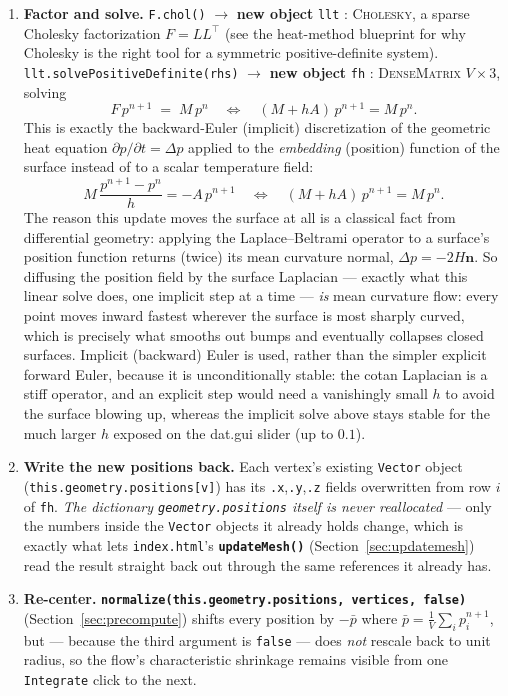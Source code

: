 \documentclass[11pt]{article}
\newcommand{\code}[1]{\texttt{#1}}
\newcommand{\func}[1]{\texttt{\textbf{#1}}}
\newcommand{\type}[1]{\textsc{#1}}
\begin{document}
\begin{enumerate}[leftmargin=1.6em]
\item \textbf{Factor and solve.} \code{F.chol()} $\to$ \textbf{new object} \code{llt} :
  \type{Cholesky}, a sparse Cholesky factorization $F=LL^{\top}$ (see the heat-method
  blueprint for why Cholesky is the right tool for a symmetric positive-definite system).
  \code{llt.solvePositiveDefinite(rhs)} $\to$ \textbf{new object} \code{fh} :
  \type{DenseMatrix} $V\times3$, solving
  \[
    F\,p^{n+1} \;=\; M\,p^{n}
    \quad\Longleftrightarrow\quad
    (M+hA)\,p^{n+1} = M\,p^{n}.
  \]
  This is exactly the backward-Euler (implicit) discretization of the geometric heat
  equation $\partial p/\partial t=\Delta p$ applied to the \emph{embedding} (position)
  function of the surface instead of to a scalar temperature field:
  \[
    M\,\frac{p^{n+1}-p^{n}}{h} = -A\,p^{n+1}
    \quad\Longleftrightarrow\quad
    (M+hA)\,p^{n+1}=M\,p^{n}.
  \]
  The reason this update moves the surface at all is a classical fact from differential
  geometry: applying the Laplace--Beltrami operator to a surface's position function
  returns (twice) its mean curvature normal, $\Delta p = -2H\mathbf{n}$. So diffusing the
  position field by the surface Laplacian --- exactly what this linear solve does, one
  implicit step at a time --- \emph{is} mean curvature flow: every point moves inward
  fastest wherever the surface is most sharply curved, which is precisely what smooths out
  bumps and eventually collapses closed surfaces. Implicit (backward) Euler is used, rather
  than the simpler explicit forward Euler, because it is unconditionally stable: the cotan
  Laplacian is a stiff operator, and an explicit step would need a vanishingly small $h$ to
  avoid the surface blowing up, whereas the implicit solve above stays stable for the much
  larger $h$ exposed on the dat.gui slider (up to $0.1$).

\item \textbf{Write the new positions back.} Each vertex's existing \code{Vector} object
  (\code{this.geometry.positions[v]}) has its \code{.x},\code{.y},\code{.z} fields
  overwritten from row $i$ of \code{fh}. \emph{The dictionary \code{geometry.positions}
  itself is never reallocated} --- only the numbers inside the \code{Vector} objects it
  already holds change, which is exactly what lets \code{index.html}'s
  \func{updateMesh()} (Section~\ref{sec:updatemesh}) read the result straight back out
  through the same references it already has.

\item \textbf{Re-center.} \func{normalize(this.geometry.positions, vertices, false)}
  (Section~\ref{sec:precompute}) shifts every position by $-\bar p$ where
  $\bar p=\tfrac1V\sum_i p_i^{n+1}$, but --- because the third argument is \code{false} ---
  does \emph{not} rescale back to unit radius, so the flow's characteristic shrinkage
  remains visible from one \code{Integrate} click to the next.
\end{enumerate}
\end{document}
